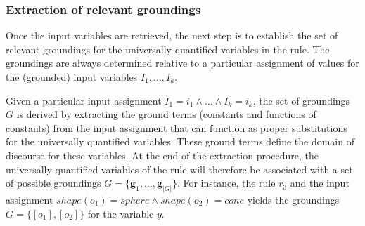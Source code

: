 


\subsubsection*{Extraction of relevant groundings}

Once the input variables are retrieved, the next step is to establish the set of relevant groundings for the universally quantified variables in the rule.  The groundings are always determined relative to a particular assignment of values for the (grounded) input variables $I_1, \dots, I_k$. 

Given a particular input assignment $I_1\!=\!i_1 \land \dots \land I_k\!=\!i_k$, the set of groundings $G$ is derived by extracting the ground terms (constants and functions of constants) from the input assignment that can function as proper substitutions for the universally quantified variables. These ground terms define the domain of discourse for these variables. At the end of the extraction procedure, the universally quantified variables of the rule will therefore be associated with a set of possible groundings $G = \{\mathbf{g}_1, \dots, \mathbf{g}_{|G|}\}$.  For instance, the rule $r_3$ and the input assignment $ \mathit{shape}(o_1)\!=\!\mathit{sphere} \land \mathit{shape}(o_2)\!=\!\mathit{cone}$ yields the groundings $G= \{[o_1], [o_2]\}$ for the variable $y$. 



